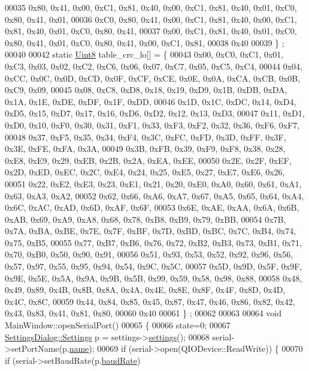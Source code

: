 \begin{DoxyCode}
00035 0x80, 0x41, 0x00, 0xC1, 0x81, 0x40, 0x00, 0xC1, 0x81, 0x40, 0x01, 0xC0, 0x80, 0x41, 0x01,
00036 0xC0, 0x80, 0x41, 0x00, 0xC1, 0x81, 0x40, 0x00, 0xC1, 0x81, 0x40, 0x01, 0xC0, 0x80, 0x41,
00037 0x00, 0xC1, 0x81, 0x40, 0x01, 0xC0, 0x80, 0x41, 0x01, 0xC0, 0x80, 0x41, 0x00, 0xC1, 0x81,
00038 0x40
00039 \} ;
00040 
00042 \textcolor{keyword}{static} \hyperlink{a00001_a979e3e23b9a449e69ab6a8a83b6042f8}{Uint8} table\_crc\_lo[] = \{
00043 0x00, 0xC0, 0xC1, 0x01, 0xC3, 0x03, 0x02, 0xC2, 0xC6, 0x06, 0x07, 0xC7, 0x05, 0xC5, 0xC4,
00044 0x04, 0xCC, 0x0C, 0x0D, 0xCD, 0x0F, 0xCF, 0xCE, 0x0E, 0x0A, 0xCA, 0xCB, 0x0B, 0xC9, 0x09,
00045 0x08, 0xC8, 0xD8, 0x18, 0x19, 0xD9, 0x1B, 0xDB, 0xDA, 0x1A, 0x1E, 0xDE, 0xDF, 0x1F, 0xDD,
00046 0x1D, 0x1C, 0xDC, 0x14, 0xD4, 0xD5, 0x15, 0xD7, 0x17, 0x16, 0xD6, 0xD2, 0x12, 0x13, 0xD3,
00047 0x11, 0xD1, 0xD0, 0x10, 0xF0, 0x30, 0x31, 0xF1, 0x33, 0xF3, 0xF2, 0x32, 0x36, 0xF6, 0xF7,
00048 0x37, 0xF5, 0x35, 0x34, 0xF4, 0x3C, 0xFC, 0xFD, 0x3D, 0xFF, 0x3F, 0x3E, 0xFE, 0xFA, 0x3A,
00049 0x3B, 0xFB, 0x39, 0xF9, 0xF8, 0x38, 0x28, 0xE8, 0xE9, 0x29, 0xEB, 0x2B, 0x2A, 0xEA, 0xEE,
00050 0x2E, 0x2F, 0xEF, 0x2D, 0xED, 0xEC, 0x2C, 0xE4, 0x24, 0x25, 0xE5, 0x27, 0xE7, 0xE6, 0x26,
00051 0x22, 0xE2, 0xE3, 0x23, 0xE1, 0x21, 0x20, 0xE0, 0xA0, 0x60, 0x61, 0xA1, 0x63, 0xA3, 0xA2,
00052 0x62, 0x66, 0xA6, 0xA7, 0x67, 0xA5, 0x65, 0x64, 0xA4, 0x6C, 0xAC, 0xAD, 0x6D, 0xAF, 0x6F,
00053 0x6E, 0xAE, 0xAA, 0x6A, 0x6B, 0xAB, 0x69, 0xA9, 0xA8, 0x68, 0x78, 0xB8, 0xB9, 0x79, 0xBB,
00054 0x7B, 0x7A, 0xBA, 0xBE, 0x7E, 0x7F, 0xBF, 0x7D, 0xBD, 0xBC, 0x7C, 0xB4, 0x74, 0x75, 0xB5,
00055 0x77, 0xB7, 0xB6, 0x76, 0x72, 0xB2, 0xB3, 0x73, 0xB1, 0x71, 0x70, 0xB0, 0x50, 0x90, 0x91,
00056 0x51, 0x93, 0x53, 0x52, 0x92, 0x96, 0x56, 0x57, 0x97, 0x55, 0x95, 0x94, 0x54, 0x9C, 0x5C,
00057 0x5D, 0x9D, 0x5F, 0x9F, 0x9E, 0x5E, 0x5A, 0x9A, 0x9B, 0x5B, 0x99, 0x59, 0x58, 0x98, 0x88,
00058 0x48, 0x49, 0x89, 0x4B, 0x8B, 0x8A, 0x4A, 0x4E, 0x8E, 0x8F, 0x4F, 0x8D, 0x4D, 0x4C, 0x8C,
00059 0x44, 0x84, 0x85, 0x45, 0x87, 0x47, 0x46, 0x86, 0x82, 0x42, 0x43, 0x83, 0x41, 0x81, 0x80,
00060 0x40
00061 \} ;
00062 
00063 
00064 \textcolor{keywordtype}{void} MainWindow::openSerialPort()
00065 \{
00066     state=0;
00067     \hyperlink{a00022_dc/dfe/a00125}{SettingsDialog::Settings} p = settings->\hyperlink{a00022_afeb533d711d0392b9856c63b40b65ad7}{settings}();
00068     serial->setPortName(p.\hyperlink{a00022_a973c8cfb942a512f34fc4227c0caa6dd}{name});
00069     \textcolor{keywordflow}{if} (serial->open(QIODevice::ReadWrite)) \{
00070         \textcolor{keywordflow}{if} (serial->setBaudRate(p.\hyperlink{a00022_ac19cc9431552857a75c657a464ba0700}{baudRate})

\end{DoxyCode}
